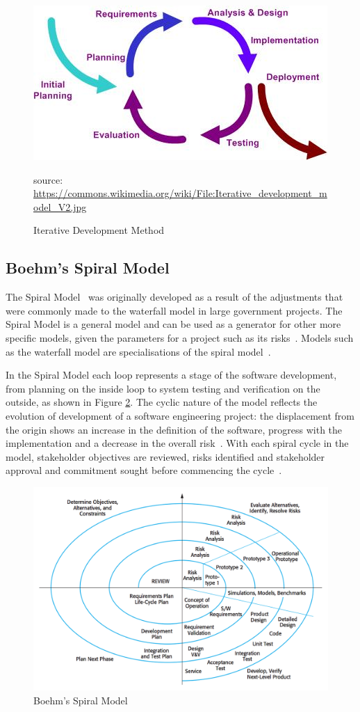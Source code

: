 \documentclass[authoryearcitations]{UoYCSproject}
\begin{document}
\begin{figure}[htb] 
\centering
    \includegraphics[width=0.8\linewidth]{iterativeDevelopment}
\caption{Iterative Development Method}
\small source: \url{https://commons.wikimedia.org/wiki/File:Iterative_development_model_V2.jpg}
\label{fig:iterativeDevelopment}
\end{figure}

\subsection{Boehm's Spiral Model}
The Spiral Model~\cite{spiralModelSoftwareDevelopment} was originally developed as a result of the adjustments that were commonly made to the waterfall model in large government projects.  The Spiral Model is a general model and can be used as a generator for other more specific models, given the parameters for a project such as its risks~\cite{boehm2000spiral}.  Models such as the waterfall model are specialisations of the spiral model~\cite{boehm2000spiral}.

In the Spiral Model each loop represents a stage of the software development, from planning on the inside loop to system testing and verification on the outside, as shown in Figure \ref{fig:spiralModel}. The cyclic nature of the model reflects the evolution of development of a software engineering project: the displacement from the origin shows an increase in the definition of the software, progress with the implementation and a decrease in the overall risk~\cite{boehm2000spiral}. With each spiral cycle in the model, stakeholder objectives are reviewed, risks identified and stakeholder approval and commitment sought before commencing the cycle~\cite{boehm2000spiral}.

\begin{figure}[htb] 
\centering
    \includegraphics[width=0.8\linewidth]{spiralModel}
\caption{Boehm's Spiral Model~\cite{sommervilleSoftwareEngineering}}
\label{fig:spiralModel}
\end{figure}
\end{document}

